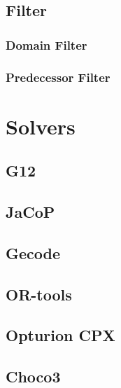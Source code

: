 \subsection{Filter}
\subsubsection{Domain Filter}
\subsubsection{Predecessor Filter}

\section{Solvers}
\subsection{G12}
\subsection{JaCoP}
\subsection{Gecode}
\subsection{OR-tools}
\subsection{Opturion CPX}
\subsection{Choco3}